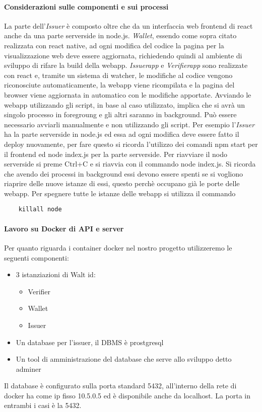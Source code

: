 \paragraph{Considerazioni sulle componenti e sui processi}
La parte dell’\textit{Issuer} è composto oltre che da un interfaccia web frontend di react anche da una parte serverside in node.js.
\textit{Wallet}, essendo come sopra citato realizzata con react native,  ad ogni modifica del codice la pagina per la visualizzazione web deve essere aggiornata, richiedendo quindi al ambiente di sviluppo di rifare la build della webapp.
\textit{Issuerapp} e \textit{Verifierapp} sono realizzate con react e, tramite un sistema di watcher,  le modifiche al codice vengono riconosciute automaticamente, la webapp viene ricompilata e la pagina del browser viene aggiornata in automatico con le modifiche apportate.
Avviando le webapp utilizzando gli script, in base al caso utilizzato, implica che si avrà un singolo processo in foregroung e gli altri saranno in background.
Può essere necessario avviarli manualmente e non utilizzando gli script. Per esempio l’\textit{Issuer} ha la parte serverside in node.js ed essa ad ogni modifica deve essere fatto il deploy nuovamente, per fare questo si ricorda l’utilizzo dei comandi npm start per il frontend ed node index.js per la parte serverside.
Per riavviare il nodo serverside si preme Ctrl+C e si riavvia con il commando node index.js.
Si ricorda che avendo dei processi in background essi devono essere spenti se si vogliono riaprire delle nuove istanze di essi, questo perchè occupano già le porte delle webapp.
Per spegnere tutte le istanze delle webapp si utilizza il commando 
\begin{verbatim}
    killall node
\end{verbatim}

\paragraph{Lavoro su Docker di API e server}
Per quanto riguarda i container docker nel nostro progetto utilizzeremo le seguenti componenti:
\begin{itemize}
    \item 3 istanziazioni di Walt id:
    \begin{itemize}
        \item Verifier
        \item Wallet
        \item Issuer
    \end{itemize}
    \item Un database per l’issuer, il DBMS è prostgresql
    \item Un tool di amministrazione del database che serve allo sviluppo detto adminer
\end{itemize}
Il database è configurato sulla porta standard 5432, all’interno della rete di docker ha come ip fisso 10.5.0.5 ed è disponibile anche da localhost.
La porta in entrambi i casi è la 5432.

